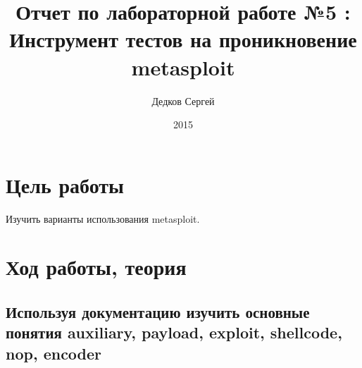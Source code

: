 \documentclass[11pt, a4paper]{article}		%
\author{Дедков Сергей}
\title{Отчет по лабораторной работе №5 :\\ Инструмент тестов на проникновение metasploit}
\date{2015}
\begin{document}
\maketitle
\tableofcontents
\newpage



\section{Цель работы}

Изучить варианты использования metasploit.




\section{Ход работы, теория}



\subsection{Используя документацию изучить основные понятия auxiliary, payload, exploit, shellcode,	nop, encoder}
\end{document}
